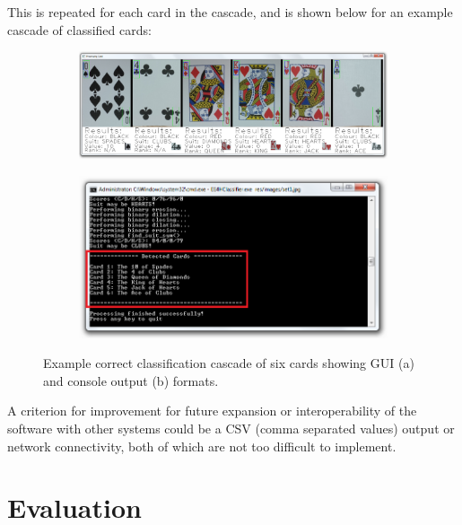 \documentclass[a4paper,12pt,notitlepage]{article}
\begin{document}
		This is repeated for each card in the cascade, and is shown below for an example cascade of classified cards:

		\begin{figure}[H]
			\centering
			\begin{subfigure}[b]{\textwidth}
				\centering
				\includegraphics[width=\textwidth]{chris/image34}
				\caption{}
			\end{subfigure}
		\end{figure}
		\begin{figure}[H]
			\ContinuedFloat
			\centering
			\begin{subfigure}[b]{\textwidth}
				\centering
				\includegraphics[width=\textwidth]{chris/image35}
				\caption{}
			\end{subfigure}
			\caption{Example correct classification cascade of six cards showing GUI (a) and console output (b) formats.}
		\end{figure}

		A criterion for improvement for future expansion or interoperability of the software with other systems could be a CSV (comma separated values) output or network connectivity, both of which are not too difficult to implement.

\pagebreak
\section{Evaluation}
\end{document}

